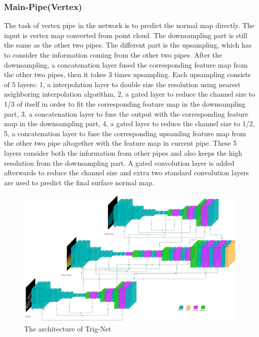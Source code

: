 \subsubsection{Main-Pipe(Vertex)}
The task of vertex pipe in the network is to predict the normal map directly. The input is vertex map converted from point cloud. The downsampling part is still the same as the other two pipes. The different part is the upsampling, which has to consider the information coming from the other two pipes. After the downsampling, a concatenation layer fused the corresponding feature map from the other two pipes, then it takes 3 times upsampling. Each upsampling consists of 5 layers: 1, a interpolation layer to double size the resolution using nearest neighboring interpolation algorithm, 2, a gated layer to reduce the channel size to 1/3 of itself in order to fit the corresponding feature map in the downsampling part, 3, a concatenation layer to fuse the output with the corresponding feature map in the downsampling part, 4, a gated layer to reduce the channel size to 1/2, 5, a concatenation layer to fuse the corresponding upsamling feature map from the other two pipe altogether with the feature map in current pipe. These 5 layers consider both the information from other pipes and also keeps the high resolution from the downsampling part. A gated convolution layer is added afterwards to reduce the channel size and extra two standard convolution layers are used to predict the final surface normal map.


\begin{figure}
	\centering
	\includegraphics[width=1\textwidth]{Figures/trignet} %
	\caption{The architecture of Trig-Net}
	\label{fig:Trig-Net}
\end{figure}






